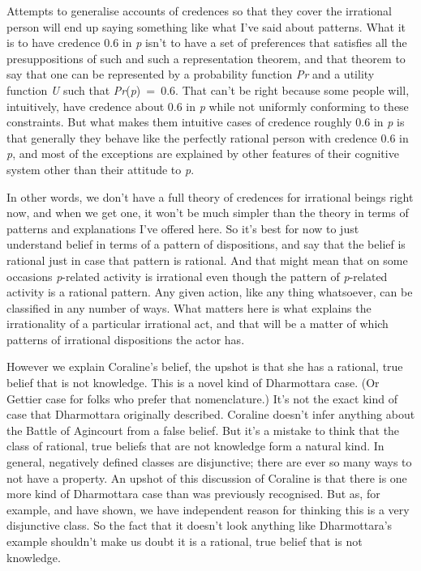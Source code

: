 \documentclass[
  11pt,
]{book}
\begin{document}
Attempts to generalise accounts of credences so that they cover the irrational person will end up saying something like what I've said about patterns. What it is to have credence 0.6 in \emph{p} isn't to have a set of preferences that satisfies all the presuppositions of such and such a representation theorem, and that theorem to say that one can be represented by a probability function \emph{Pr} and a utility function \emph{U} such that \emph{Pr}(\emph{p})~=~0.6. That can't be right because some people will, intuitively, have credence about 0.6 in \emph{p} while not uniformly conforming to these constraints. But what makes them intuitive cases of credence roughly 0.6 in \emph{p} is that generally they behave like the perfectly rational person with credence 0.6 in \emph{p}, and most of the exceptions are explained by other features of their cognitive system other than their attitude to \emph{p}.

In other words, we don't have a full theory of credences for irrational beings right now, and when we get one, it won't be much simpler than the theory in terms of patterns and explanations I've offered here. So it's best for now to just understand belief in terms of a pattern of dispositions, and say that the belief is rational just in case that pattern is rational. And that might mean that on some occasions \emph{p}-related activity is irrational even though the pattern of \emph{p}-related activity is a rational pattern. Any given action, like any thing whatsoever, can be classified in any number of ways. What matters here is what explains the irrationality of a particular irrational act, and that will be a matter of which patterns of irrational dispositions the actor has.

However we explain Coraline's belief, the upshot is that she has a rational, true belief that is not knowledge. This is a novel kind of Dharmottara case. (Or Gettier case for folks who prefer that nomenclature.) It's not the exact kind of case that Dharmottara originally described. Coraline doesn't infer anything about the Battle of Agincourt from a false belief. But it's a mistake to think that the class of rational, true beliefs that are not knowledge form a natural kind. In general, negatively defined classes are disjunctive; there are ever so many ways to not have a property. An upshot of this discussion of Coraline is that there is one more kind of Dharmottara case than was previously recognised. But as, for example, \citet{WilliamsonLofoten} and \citet{Nagel2013-Williamson} have shown, we have independent reason for thinking this is a very disjunctive class. So the fact that it doesn't look anything like Dharmottara's example shouldn't make us doubt it is a rational, true belief that is not knowledge.
\end{document}
